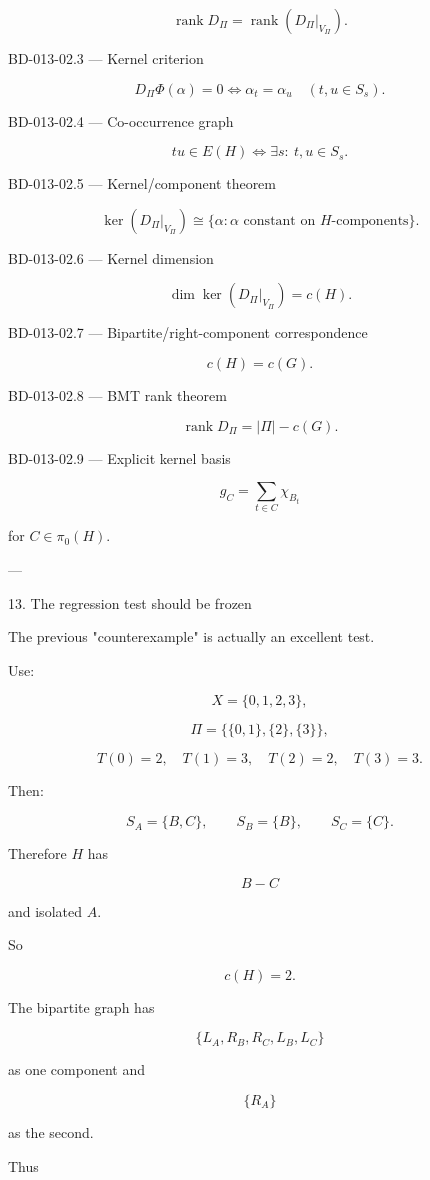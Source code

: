 \[
\operatorname{rank}D_\Pi
=
\operatorname{rank}(D_\Pi|_{V_\Pi}).
\]

BD-013-02.3 — Kernel criterion

\[
D_\Pi\Phi(\alpha)=0
\iff
\alpha_t=\alpha_u
\quad
(t,u\in S_s).
\]

BD-013-02.4 — Co-occurrence graph

\[
tu\in E(H)
\iff
\exists s:\ t,u\in S_s.
\]

BD-013-02.5 — Kernel/component theorem

\[
\ker(D_\Pi|_{V_\Pi})
\cong
\{\alpha:\alpha\text{ constant on }H\text{-components}\}.
\]

BD-013-02.6 — Kernel dimension

\[
\dim\ker(D_\Pi|_{V_\Pi})=c(H).
\]

BD-013-02.7 — Bipartite/right-component correspondence

\[
c(H)=c(G).
\]

BD-013-02.8 — BMT rank theorem

\[
\boxed{
\operatorname{rank}D_\Pi=|\Pi|-c(G).
}
\]

BD-013-02.9 — Explicit kernel basis

\[
\boxed{
g_C=\sum_{t\in C}\chi_{B_t}
}
\]

for \(C\in\pi_0(H)\).


---

13. The regression test should be frozen

The previous "counterexample" is actually an excellent test.

Use:

\[
X=\{0,1,2,3\},
\]

\[
\Pi=\{\{0,1\},\{2\},\{3\}\},
\]

\[
T(0)=2,\quad
T(1)=3,\quad
T(2)=2,\quad
T(3)=3.
\]

Then:

\[
S_A=\{B,C\},
\qquad
S_B=\{B\},
\qquad
S_C=\{C\}.
\]

Therefore \(H\) has

\[
B-C
\]

and isolated \(A\).

So

\[
c(H)=2.
\]

The bipartite graph has

\[
\{L_A,R_B,R_C,L_B,L_C\}
\]

as one component and

\[
\{R_A\}
\]

as the second.

Thus

